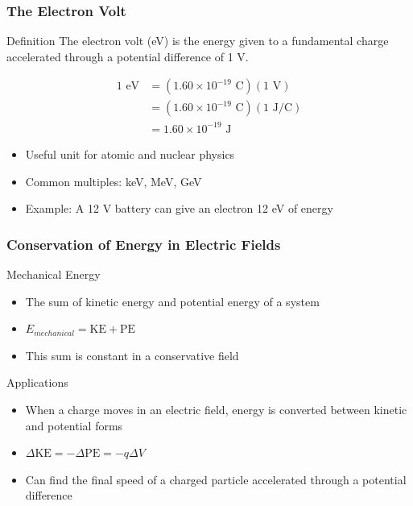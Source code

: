 \documentclass{beamer}
\begin{document}
\begin{frame}
    \frametitle{The Electron Volt}
    
    \begin{block}{Definition}
        The electron volt (eV) is the energy given to a fundamental charge accelerated through a potential difference of 1 V.
    \end{block}
    
    \begin{align}
        1 \text{ eV} &= (1.60 \times 10^{-19} \text{ C})(1 \text{ V}) \\
        &= (1.60 \times 10^{-19} \text{ C})(1 \text{ J/C}) \\
        &= 1.60 \times 10^{-19} \text{ J}
    \end{align}
    
    \begin{itemize}
        \item Useful unit for atomic and nuclear physics
        \item Common multiples: keV, MeV, GeV
        \item Example: A 12 V battery can give an electron 12 eV of energy
    \end{itemize}
\end{frame}

\begin{frame}
    \frametitle{Conservation of Energy in Electric Fields}
    
    \begin{block}{Mechanical Energy}
        \begin{itemize}
            \item The sum of kinetic energy and potential energy of a system
            \item $E_{mechanical} = \text{KE} + \text{PE}$
            \item This sum is constant in a conservative field
        \end{itemize}
    \end{block}
    
    \begin{block}{Applications}
        \begin{itemize}
            \item When a charge moves in an electric field, energy is converted between kinetic and potential forms
            \item $\Delta \text{KE} = -\Delta \text{PE} = -q\Delta V$
            \item Can find the final speed of a charged particle accelerated through a potential difference
        \end{itemize}
    \end{block}
\end{frame}
\end{document}

